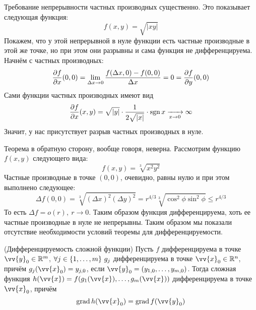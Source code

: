 \begin{example}
	Требование непрерывности частных производных существенно. Это показывает следующая функция:
	\[
		f(x, y) = \sqrt{|xy|}
	\]
	Покажем, что у этой непрерывной в нуле функции есть частные производные в этой же точке, но при этом они разрывны и сама функция не дифференцируема. Начнём с частных производных:
	\[
		\frac{\partial f}{\partial x}(0, 0) = \lim\limits_{\Delta x \to 0} \frac{f(\Delta x, 0) - f(0, 0)}{\Delta x} = 0 = \frac{\partial f}{\partial y}(0, 0)
	\]
	Сами функции частных производных имеют вид
	\[
		\frac{\partial f}{\partial x}(x, y) = \sqrt{|y|} \cdot \frac{1}{2\sqrt{|x|}} \cdot \operatorname{sgn}{x} \xrightarrow[x \to 0]{} \infty
	\]
	Значит, у нас присутствует разрыв частных производных в нуле.
\end{example}

\begin{example}
	Теорема в обратную сторону, вообще говоря, неверна. Рассмотрим функцию $f(x, y)$ следующего вида:
	\[
		f(x, y) = \sqrt[3]{x^2 y^2}
	\]
	Частные производные в точке $(0, 0)$, очевидно, равны нулю и при этом выполнено следующее:
	\[
		\Delta f(0, 0) = \sqrt[3]{(\Delta x)^2 (\Delta y)^2} = r^{4/3} \sqrt[3]{\cos^2 \phi \sin^2 \phi} \le r^{4/3}
	\]
	То есть $\Delta f = o(r),\ r \to 0$. Таким образом функция дифференцируема, хоть ее частные производные в нуле не непрерывны. Таким образом мы показали отсутствие необходимости условий теоремы для дифференцируемости.
\end{example}

\begin{theorem} (Дифференцируемость сложной функции)
	Пусть $f$ дифференцируема в точке $\vv{y}_0 \in \R^m$, $\forall j \in \range{m}\ g_j$ дифференцируема в точке $\vv{x}_0 \in \R^n$, причём $g_j(\vv{x}_0) = y_{j, 0}$, если $\vv{y}_0 = (y_{1, 0}, \ldots, y_{m, 0})$. Тогда сложная функция $h(\vv{x}) = f(g_1(\vv{x}), \ldots, g_m(\vv{x}))$ дифференцируема в точке $\vv{x}_0$, причём
	\[
		\grad h(\vv{x}_0) = \grad f(\vv{y}_0)
	\]
\end{theorem}

